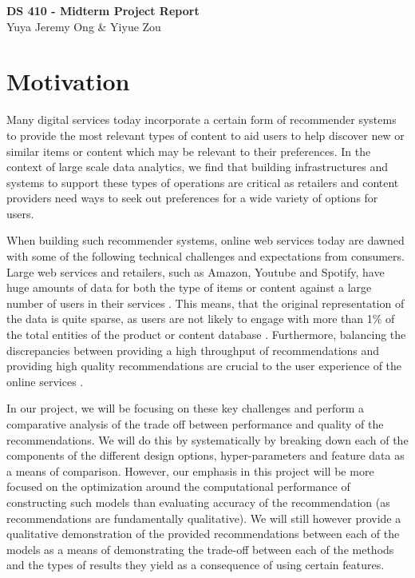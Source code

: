 \documentclass[a4paper, 11pt]{article}
\begin{document}
\noindent
\large\textbf{DS 410 - Midterm Project Report} \\
\normalsize Yuya Jeremy Ong \& Yiyue Zou \\

\section*{Motivation}
Many digital services today incorporate a certain form of recommender systems to provide the most relevant types of content to aid users to help discover new or similar items or content which may be relevant to their preferences. In the context of large scale data analytics, we find that building infrastructures and systems to support these types of operations are critical as retailers and content providers need ways to seek out preferences for a wide variety of options for users.

When building such recommender systems, online web services today are dawned with some of the following technical challenges and expectations from consumers. Large web services and retailers, such as Amazon, Youtube and Spotify, have huge amounts of data for both the type of items or content against a large number of users in their services \cite{Linden13}. This means, that the original representation of the data is quite sparse, as users are not likely to engage with more than 1\% of the total entities of the product or content database \cite{Sarwar01}. Furthermore, balancing the discrepancies between providing a high throughput of recommendations and providing high quality recommendations are crucial to the user experience of the online services \cite{Linden13}.

In our project, we will be focusing on these key challenges and perform a comparative analysis of the trade off between performance and quality of the recommendations. We will do this by systematically by breaking down each of the components of the different design options, hyper-parameters and feature data as a means of comparison. However, our emphasis in this project will be more focused on the optimization around the computational performance of constructing such models than evaluating accuracy of the recommendation (as recommendations are fundamentally qualitative). We will still however provide a qualitative demonstration of the provided recommendations between each of the models as a means of demonstrating the trade-off between each of the methods and the types of results they yield as a consequence of using certain features.
\end{document}
